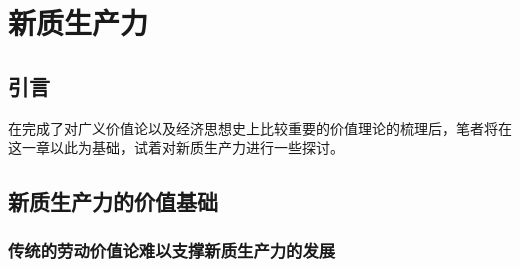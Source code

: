 \chapter{新质生产力}

\section{引言}

在完成了对广义价值论以及经济思想史上比较重要的价值理论的梳理后，笔者将在这一章以此为基础，试着对新质生产力进行一些探讨。

\section{新质生产力的价值基础}

\subsection{传统的劳动价值论难以支撑新质生产力的发展}